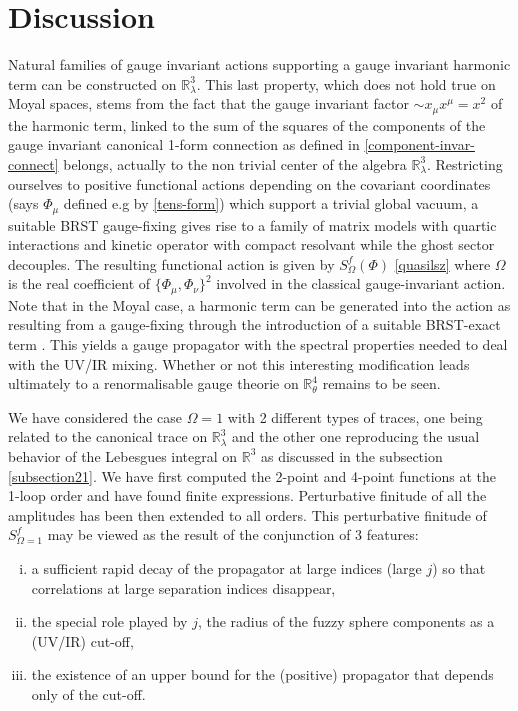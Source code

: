 \documentclass[a4paper,11pt,twoside]{article}
\numberwithin{equation}{section}
\theoremstyle{nonumberplain}
\newcounter{and}
\begin{document}
\section{Discussion}\label{section4}

Natural families of gauge invariant actions supporting a gauge invariant harmonic term can be constructed on $\mathbb{R}^3_\lambda$. This last property, which does not hold true on Moyal spaces, stems from the fact that the gauge invariant factor $\sim x_\mu x^\mu=x^2$ of the harmonic term, linked to the sum of the squares of the components of the gauge invariant canonical 1-form connection as defined in \eqref{component-invar-connect} belongs, actually to the non trivial center of the algebra $\mathbb{R}^3_\lambda$. Restricting ourselves to positive functional actions depending on the covariant coordinates (says $\Phi_\mu$ defined e.g by \eqref{tens-form}) which support a trivial global vacuum, a suitable BRST gauge-fixing gives rise to a family of matrix models with quartic interactions and kinetic operator with compact resolvant while the ghost sector decouples. The resulting functional action is given by $S_\Omega^f(\Phi)$ \eqref{quasilsz} where $\Omega$ is the real coefficient of $\{\Phi_\mu,\Phi_\nu\}^2$ involved in the classical gauge-invariant action.\\
Note that in the Moyal case, a harmonic term can be generated into the action as resulting from a gauge-fixing through the introduction of a suitable BRST-exact term \cite{blaschke-epl}. This yields a gauge propagator with the spectral properties needed to deal with the UV/IR mixing. Whether or not this interesting modification leads ultimately to a renormalisable gauge theorie on $\mathbb{R}^4_\theta$ remains to be seen.\par

We have considered the case $\Omega=1$ with 2 different types of traces, one being related to the canonical trace on $\mathbb{R}^3_\lambda$ and the other one reproducing the usual behavior of the Lebesgues integral on $\mathbb{R}^3$ as discussed in the subsection \ref{subsection21}. We have first computed the 2-point and 4-point functions at the 1-loop order and have found finite expressions. Perturbative finitude of all the amplitudes has been then extended to all orders. This perturbative finitude of $S^f_{\Omega=1}$ may be viewed as the result of the conjunction of 3 features:
\begin{enumerate}[i)]
 \item a sufficient rapid decay of the propagator at large indices (large $j$) so that correlations at large separation indices disappear,
\item the special role played by $j$, the radius of the fuzzy sphere components as a (UV/IR) cut-off, 
\item the existence of an upper bound for the (positive) propagator that depends only of the cut-off.
\end{enumerate}\par 
\end{document}
